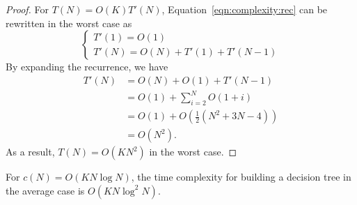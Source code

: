 \begin{proof}
For $T(N) = O(K)T'(N)$, Equation~\ref{eqn:complexity:rec}
can be rewritten in the worst case as
\begin{equation}
\begin{cases}
T'(1) = O(1) \\
T'(N) = O(N) +  T'(1) + T'(N-1)
\end{cases}
\end{equation}
By expanding the recurrence, we have
\begin{align}
T'(N) &= O(N) + O(1) + T'(N-1) \nonumber \\
      &= O(1) + \sum_{i=2}^N O(1+i) \nonumber \\
      &= O(1) + O(\frac{1}{2} (N^2 + 3N - 4)) \nonumber \\
      &= O(N^2).
\end{align}
As a result, $T(N) = O(K N^2)$ in the worst case.
\end{proof}

\begin{theorem}\label{thm:6:average:knlogn}
For $c(N)=O(K N\log N)$, the time complexity for building a decision
tree in the average case is $O(K N \log^2 N)$.
\end{theorem}

